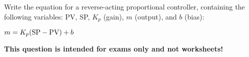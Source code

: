 

Write the equation for a reverse-acting proportional controller, containing the following variables: PV, SP, $K_p$ (gain), $m$ (output), and $b$ (bias):

\vskip 100pt







$m = K_p(\hbox{SP} - \hbox{PV}) + b$







{\bf This question is intended for exams only and not worksheets!}



